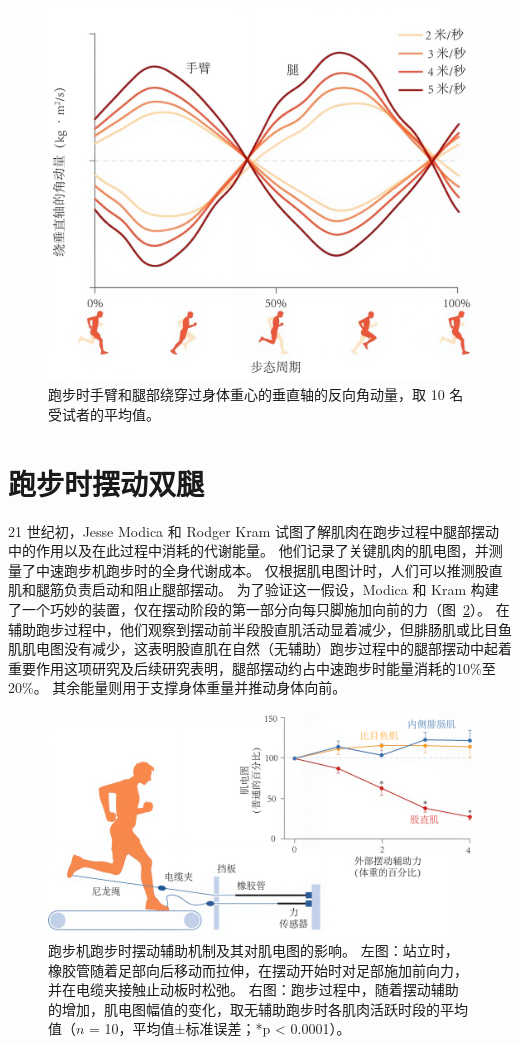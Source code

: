 \begin{figure}[!htb]
	\centering
	\includegraphics[width=0.75\linewidth]{chap12/12_7}
	\caption{跑步时手臂和腿部绕穿过身体重心的垂直轴的反向角动量，取 10 名受试者的平均值\cite{hamner2013muscle}。 \label{fig:12_7}}
\end{figure}


\section{跑步时摆动双腿}

21 世纪初，Jesse Modica 和 Rodger Kram 试图了解肌肉在跑步过程中腿部摆动中的作用以及在此过程中消耗的代谢能量。
他们记录了关键肌肉的肌电图，并测量了中速跑步机跑步时的全身代谢成本。
仅根据肌电图计时，人们可以推测股直肌和腿筋负责启动和阻止腿部摆动。
为了验证这一假设，Modica 和 Kram 构建了一个巧妙的装置，仅在摆动阶段的第一部分向每只脚施加向前的力（图~\ref{fig:12_8}）。
在辅助跑步过程中，他们观察到摆动前半段股直肌活动显着减少，但腓肠肌或比目鱼肌肌电图没有减少，这表明股直肌在自然（无辅助）跑步过程中的腿部摆动中起着重要作用这项研究及后续研究表明，腿部摆动约占中速跑步时能量消耗的10\%至20\%。
其余能量则用于支撑身体重量并推动身体向前。

\begin{figure}[!htb]
	\centering
	\includegraphics[width=1.0\linewidth]{chap12/12_8}
	\caption{跑步机跑步时摆动辅助机制及其对肌电图的影响。
		左图：站立时，橡胶管随着足部向后移动而拉伸，在摆动开始时对足部施加前向力，并在电缆夹接触止动板时松弛。
		右图：跑步过程中，随着摆动辅助的增加，肌电图幅值的变化，取无辅助跑步时各肌肉活跃时段的平均值（$n$ = 10，平均值±标准误差；*p < 0.0001）\cite{modica2005metabolic}。 \label{fig:12_8}}
\end{figure}



